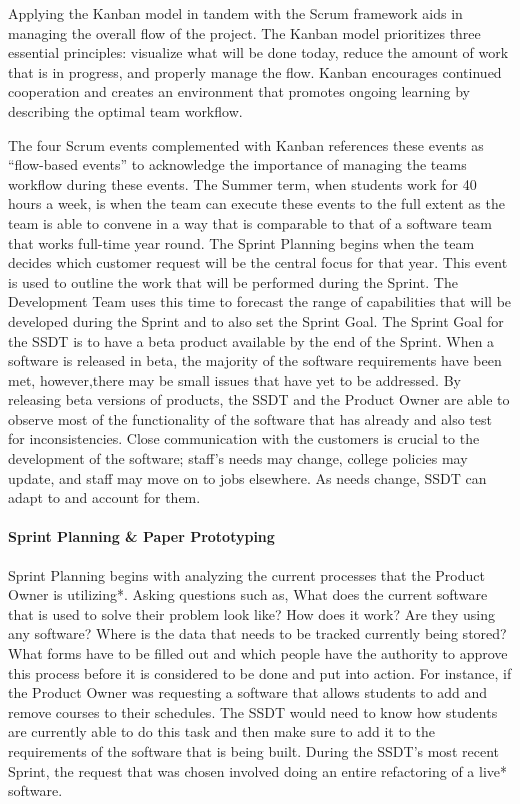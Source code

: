Applying the Kanban model \cite{} in tandem with the Scrum framework aids in managing the overall flow of the project. The Kanban model prioritizes three essential principles: visualize what will be done today, reduce the amount of work that is in progress, and properly manage the flow. Kanban encourages continued cooperation and creates an environment that promotes ongoing learning by describing the optimal team workflow.

The four Scrum events complemented with Kanban references these events as ``flow-based events'' to acknowledge the importance of managing the teams workflow during these events. The Summer term, when students work for 40 hours a week, is when the team can execute these events to the full extent as the team is able to convene in a way that is comparable to that of a software team that works full-time year round. The Sprint Planning begins when the team decides which customer request will be the central focus for that year. This event is used to outline the work that will be performed during the Sprint. The Development Team uses this time to forecast the range of capabilities that will be developed during the Sprint and to also set the Sprint Goal. The Sprint Goal for the SSDT is to have a beta product available by the end of the Sprint.  When a software is released in beta, the majority of the software requirements have been met, however,there may be small issues that have yet to be addressed.  By releasing beta versions of products, the SSDT and the Product Owner are able to observe most of the functionality of the software that has already and also test for inconsistencies. Close communication with the customers is crucial to the development of the software; staff's needs may change, college policies may update, and staff may move on to jobs elsewhere. As needs change, SSDT can adapt to and account for them.



\paragraph{Sprint Planning & Paper Prototyping}
Sprint Planning begins with analyzing the current processes that the Product Owner is utilizing*. Asking questions such as, What does the current software that is used to solve their problem look like? How does it work? Are they using any software? Where is the data that needs to be tracked currently being stored? What forms have to be filled out and which people have the authority to approve this process before it is considered to be done and put into action. For instance, if the Product Owner was requesting a software that allows students to add and remove courses to their schedules. The SSDT would need to know how students are currently able to do this task and then make sure to add it to the requirements of the software that is being built. During the SSDT's most recent Sprint, the request that was chosen involved doing an entire refactoring of a live* software.

